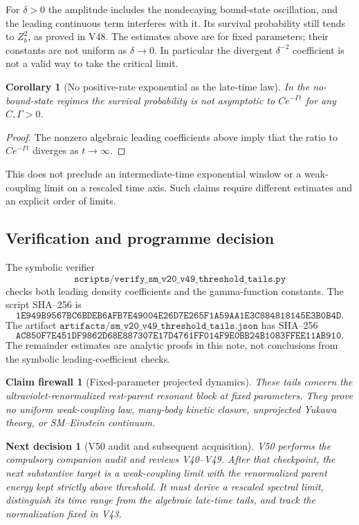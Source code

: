 \documentclass[11pt]{article}
\newtheorem{corollary}[theorem]{Corollary}
\newtheorem{firewall}[theorem]{Claim firewall}
\newtheorem{decision}[theorem]{Next decision}
\theoremstyle{remark}
\begin{document}
For \(\delta>0\) the amplitude includes the nondecaying
bound-state oscillation, and the leading continuous term
interferes with it.  Its survival probability still tends
to \(Z_b^2\), as proved in V48.
The estimates above are for fixed parameters; their constants
are not uniform as \(\delta\to0\).  In particular the divergent
\(\delta^{-2}\) coefficient is not a valid way to take the
critical limit.

\begin{corollary}[No positive-rate exponential as the late-time law]
\label{cor:v20v49-nonexponential}
In the no-bound-state regimes the survival probability is not
asymptotic to \(C e^{-\Gamma t}\) for any \(C,\Gamma>0\).
\end{corollary}
\begin{proof}
The nonzero algebraic leading coefficients above imply that
the ratio to \(C e^{-\Gamma t}\) diverges as \(t\to\infty\).
\end{proof}

This does not preclude an intermediate-time exponential window
or a weak-coupling limit on a rescaled time axis.  Such claims
require different estimates and an explicit order of limits.

\subsection{Verification and programme decision}

The symbolic verifier
\[
 \texttt{scripts/verify\_sm\_v20\_v49\_threshold\_tails.py}
\]
checks both leading density coefficients and the gamma-function
constants.  The script SHA--256 is
\[
\texttt{1E949B9567BC6BDEB6AFB7E49004E26D7E265F1A59AA1E3C884818145E3B0B4D}.
\]
The artifact
\(\texttt{artifacts/sm\_v20\_v49\_threshold\_tails.json}\)
has SHA--256
\[
\texttt{AC850F7E451DF9862D68E887307E17D4761FF014F9E0BB24B1083FFEE11AB910}.
\]
The remainder estimates are analytic proofs in this note,
not conclusions from the symbolic leading-coefficient checks.

\begin{firewall}[Fixed-parameter projected dynamics]
\label{fire:v20v49}
These tails concern the ultraviolet-renormalized rest-parent
resonant block at fixed parameters.  They prove no uniform
weak-coupling law, many-body kinetic closure, unprojected
Yukawa theory, or SM--Einstein continuum.
\end{firewall}

\begin{decision}[V50 audit and subsequent acquisition]
\label{dec:v20v49-next}
V50 performs the compulsory companion audit and reviews V40--V49.
After that checkpoint, the next substantive target is a
weak-coupling limit with the renormalized parent energy kept
strictly above threshold.  It must derive a rescaled spectral
limit, distinguish its time range from the algebraic late-time
tails, and track the normalization fixed in V43.
\end{decision}
\end{document}
